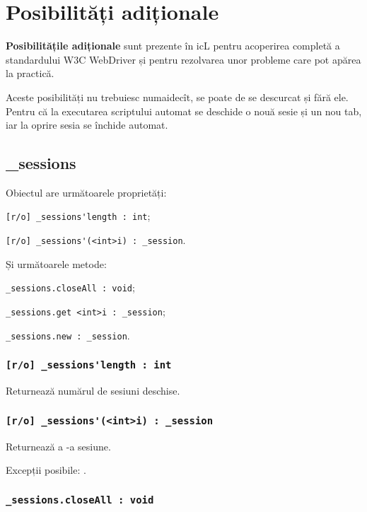 \section{Posibilități adiționale}

{\bf Posibilitățile adiționale} sunt prezente în icL pentru acoperirea completă a standardului W3C WebDriver și pentru rezolvarea unor probleme care pot apărea la practică.

Aceste posibilități nu trebuiesc numaidecît, se poate de se descurcat și fără ele. Pentru că la executarea scriptului automat se deschide o nouă sesie și un nou tab, iar la oprire sesia se închide automat.

\subsection{{\color{orange} \_sessions}}

Obiectul \sessions{} are următoarele proprietăți:
\begin{icItems}
	\item \lstinline|[r/o] _sessions'length : int|;
	\item \lstinline|[r/o] _sessions'(<int>i) : _session|.
\end{icItems}

Și următoarele metode:
\begin{icItems}
	\item \lstinline|_sessions.closeAll : void|;
	\item \lstinline|_sessions.get <int>i : _session|;
	\item \lstinline|_sessions.new : _session|.
\end{icItems}

\subsubsection{\lstinline|[r/o] _sessions'length : int|}

Returnează numărul de sesiuni deschise.

\subsubsection{\lstinline|[r/o] _sessions'(<int>i) : _session|}

Returnează a -a sesiune.

Excepții posibile: .

\subsubsection{\lstinline|_sessions.closeAll : void|}

